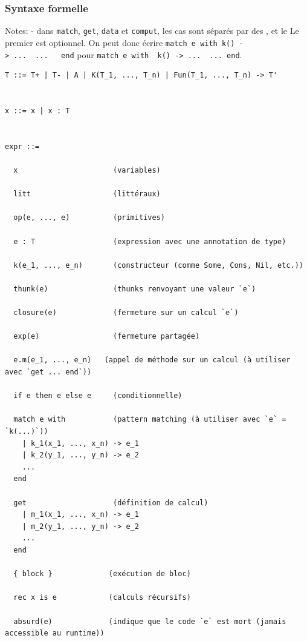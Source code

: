 \documentclass[12pt]{article}
\begin{document}
\hypertarget{syntaxe-formelle}{%
      \subsubsection*{Syntaxe formelle}\label{syntaxe-formelle}}

Notes: - dans \texttt{match}, \texttt{get}, \texttt{data} et
\texttt{comput}, les cas sont séparés par des \texttt{\textbar{}}, et le
Le premier est optionnel. On peut donc écrire
\texttt{match\ e\ with\ k()\ -\textgreater{}\ ...\ \textbar{}\ ...\ \ \ end}
pour
\texttt{match\ e\ with\ \textbar{}\ k()\ -\textgreater{}\ ...\ \textbar{}\ ...\ end}.

\begin{verbatim}
T ::= T+ | T- | A | K(T_1, ..., T_n) | Fun(T_1, ..., T_n) -> T'


x ::= x | x : T 


expr ::= 

  x                      (variables)
    
  litt                   (littéraux) 
    
  op(e, ..., e)          (primitives)
  
  e : T                  (expression avec une annotation de type)
  
  k(e_1, ..., e_n)       (constructeur (comme Some, Cons, Nil, etc.))
  
  thunk(e)               (thunks renvoyant une valeur `e`)
  
  closure(e)             (fermeture sur un calcul `e`)
  
  exp(e)                 (fermeture partagée)
  
  e.m(e_1, ..., e_n)   (appel de méthode sur un calcul (à utiliser avec `get ... end`))
  
  if e then e else e     (conditionnelle)
  
  match e with           (pattern matching (à utiliser avec `e` = `k(...)`)) 
    | k_1(x_1, ..., x_n) -> e_1
    | k_2(y_1, ..., y_n) -> e_2
    ...
  end
  
  get                    (définition de calcul)
    | m_1(x_1, ..., x_n) -> e_1
    | m_2(y_1, ..., y_n) -> e_2
    ...
  end
  
  { block }             (exécution de bloc)
  
  rec x is e            (calculs récursifs)
  
  absurd(e)             (indique que le code `e` est mort (jamais accessible au runtime))



\end{verbatim}
\end{document}
